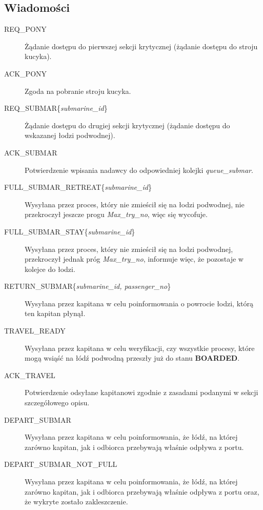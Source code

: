 \documentclass[a4paper]{article}
\begin{document}
\subsection{Wiadomości}
\begin{description}
    \item [REQ\_PONY] Żądanie dostępu do pierwszej sekcji krytycznej (żądanie dostępu do stroju kucyka).
    \item [ACK\_PONY] Zgoda na pobranie stroju kucyka.
    \item [REQ\_SUBMAR\{\textit{submarine\_id}\}] Żądanie dostępu do drugiej sekcji krytycznej (żądanie dostępu do wskazanej łodzi podwodnej).
    \item [ACK\_SUBMAR] Potwierdzenie wpisania nadawcy do odpowiedniej kolejki \textit{queue\_submar}.
    \item [FULL\_SUBMAR\_RETREAT\{\textit{submarine\_id}\}] Wysyłana przez proces, który nie zmieścił się na łodzi podwodnej, nie przekroczył jeszcze progu \textit{Max\_try\_no}, więc się wycofuje.
    \item [FULL\_SUBMAR\_STAY\{\textit{submarine\_id}\}] Wysyłana przez proces, który nie zmieścił się na łodzi podwodnej, przekroczył jednak próg \textit{Max\_try\_no}, informuje więc, że pozostaje w kolejce do łodzi.
    \item [RETURN\_SUBMAR\{\textit{submarine\_id, passenger\_no}\}] Wysyłana przez kapitana w celu poinformowania o powrocie łodzi, którą ten kapitan płynął.
    \item [TRAVEL\_READY] Wysyłana przez kapitana w celu weryfikacji, czy wszystkie procesy, które mogą wsiąść na łódź podwodną przeszły już do stanu \textbf{BOARDED}.
    \item [ACK\_TRAVEL] Potwierdzenie odsyłane kapitanowi zgodnie z zasadami podanymi w sekcji szczegółowego opisu.
    \item [DEPART\_SUBMAR] Wysyłana przez kapitana w celu poinformowania, że łódź, na której zarówno kapitan, jak i odbiorca przebywają właśnie odpływa z portu.
    \item [DEPART\_SUBMAR\_NOT\_FULL] Wysyłana przez kapitana w celu poinformowania, że łódź, na której zarówno kapitan, jak i odbiorca przebywają właśnie odpływa z portu oraz, że wykryte zostało zakleszczenie.
\end{description}

\resetlinenumber[1]\linenumbers
\end{document}
